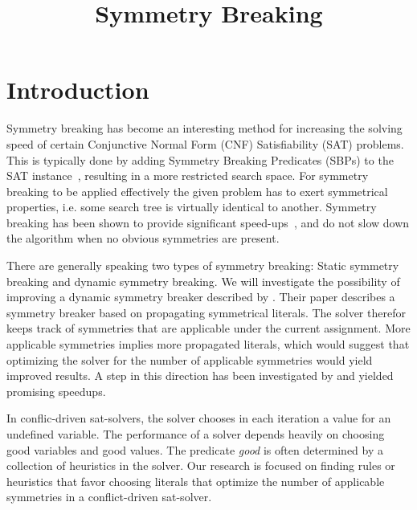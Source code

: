

\title{Symmetry Breaking}


	\maketitle

	\listoftodos

	\begin{abstract}
	\end{abstract}

	\section{Introduction}
	\label{sec:Introduction}

		Symmetry breaking has become an interesting method for increasing the solving speed of
		certain Conjunctive Normal Form (CNF) Satisfiability (SAT) problems.
		This is typically done by adding Symmetry Breaking Predicates (SBPs) to the SAT
		instance~\cite{sakallah2009symmetry}, resulting in a more restricted search space.
		For symmetry breaking to be applied effectively the given problem has to exert symmetrical
		properties, i.e. some search tree is virtually identical to another.
		Symmetry breaking has been shown to provide significant
		speed-ups~\cite{darga2004exploiting,aloul2003solving}, and do not slow down the algorithm
		when no obvious symmetries are present.

		There are generally speaking two types of symmetry breaking: Static symmetry breaking and
		dynamic symmetry breaking.
		We will investigate the possibility of improving a dynamic symmetry breaker described by
		\cite{devriendt2012symmetry}.
		Their paper describes a symmetry breaker based on propagating symmetrical literals.
		The solver therefor keeps track of symmetries that are applicable under the current assignment.
		More applicable symmetries implies more propagated literals, which would suggest that
		optimizing the solver for the number of applicable symmetries would yield improved results.
		A step in this direction has been investigated by \cite{devriendt2012symmetry} and yielded
		promising speedups.

		In conflic-driven sat-solvers, the solver chooses in each iteration a value for an undefined
		variable.
		The performance of a solver depends heavily on choosing good variables and good values.
		The predicate \emph{good} is often determined by a collection of heuristics in the solver.
		Our research is focused on finding rules or heuristics that favor choosing literals
		that optimize the number of applicable symmetries in a conflict-driven sat-solver.

